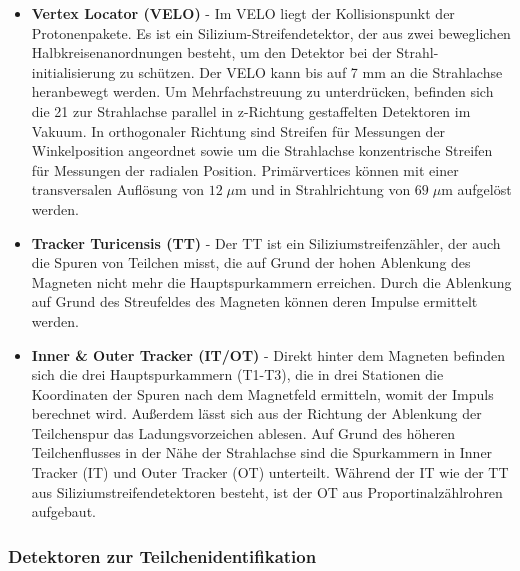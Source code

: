 \documentclass{article}
\begin{document}
\begin{itemize}
\item \textbf{Vertex Locator (VELO)}  \cite{SISSA2008} - Im VELO liegt der Kollisionspunkt der Protonenpakete. Es ist ein Silizium-Streifendetektor, der aus zwei beweglichen Halbkreisenanordnungen besteht, um den Detektor bei der Strahl-initialisierung zu schützen. Der VELO kann bis auf 7 mm an die Strahlachse heranbewegt werden. Um Mehrfachstreuung zu unterdrücken, befinden sich die 21 zur Strahlachse parallel in z-Richtung gestaffelten Detektoren im Vakuum. In orthogonaler Richtung sind Streifen für Messungen der Winkelposition angeordnet sowie um die Strahlachse konzentrische Streifen für Messungen der radialen Position. Primärvertices können mit einer transversalen Auflösung von $12\;\text{$\mu$m}$ und in Strahlrichtung von $69\;\text{$\mu$m}$ \cite{veloperf} aufgelöst werden. 

\item \textbf{Tracker Turicensis (TT)}  \cite{SISSA2008} - Der TT ist ein Siliziumstreifenzähler, der auch die Spuren von Teilchen misst, die auf Grund der hohen Ablenkung des Magneten nicht mehr die Hauptspurkammern erreichen. Durch die Ablenkung auf Grund des Streufeldes des Magneten können deren Impulse ermittelt werden.

\item \textbf{Inner \& Outer Tracker (IT/OT)}  \cite{SISSA2008} - Direkt hinter dem Magneten befinden sich die drei Hauptspurkammern (T1-T3), die in drei Stationen die Koordinaten der Spuren nach dem Magnetfeld ermitteln, womit der Impuls berechnet wird. Außerdem lässt sich aus der Richtung der Ablenkung der Teilchenspur das Ladungsvorzeichen ablesen. Auf Grund des höheren Teilchenflusses in der Nähe der Strahlachse sind die Spurkammern in Inner Tracker (IT) und Outer Tracker (OT) unterteilt. Während der IT wie der TT aus Siliziumstreifendetektoren besteht, ist der OT aus Proportinalzählrohren aufgebaut.
\end{itemize}

\subsubsection{Detektoren zur Teilchenidentifikation}
\end{document}

